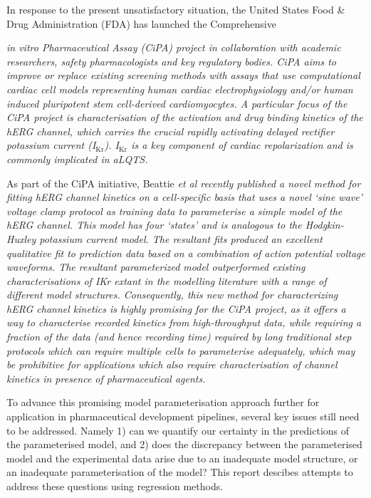 \documentclass[11pt,a4paper,oneside]{article}
\begin{document}
In response to the present unsatisfactory situation, the United States Food \& Drug Administration (FDA) has launched the Comprehensive {\it{in vitro} Pharmaceutical Assay (CiPA) project in collaboration with academic researchers, safety pharmacologists and key regulatory bodies. CiPA aims to improve or replace existing screening methods with assays that use computational cardiac cell models representing human cardiac electrophysiology and/or human induced pluripotent stem cell-derived cardiomyocytes. A particular focus of the CiPA project is characterisation of the activation and drug binding kinetics of the hERG channel, which carries the crucial rapidly activating delayed rectifier potassium current (I$_{\text{Kr}}$). I$_{\text{Kr}}$ is a key component of cardiac repolarization and is commonly implicated in aLQTS.

As part of the CiPA initiative, Beattie \it{et al} recently published a novel method for fitting hERG channel kinetics on a cell-specific basis that uses a novel `sine wave' voltage clamp protocol as training data to parameterise a simple model of the hERG channel. This model has four `states' and is analogous to the Hodgkin-Huxley potassium current model. The resultant fits produced an excellent qualitative fit to prediction data based on a combination of action potential voltage waveforms. The resultant parameterized model outperformed existing characterisations of IKr extant in the modelling literature with a range of different model structures. Consequently, this new method for characterizing hERG channel kinetics is highly promising for the CiPA project, as it offers a way to characterise recorded kinetics from high-throughput data, while requiring a fraction of the data (and hence recording time) required by long traditional step protocols which can require multiple cells to parameterise adequately, which may be prohibitive for applications which also require characterisation of channel kinetics in presence of pharmaceutical agents.

To advance this promising model parameterisation approach further for application in pharmaceutical development pipelines, several key issues still need to be addressed. Namely 1) can we quantify our certainty in the predictions of the parameterised model, and 2) does the discrepancy between the parameterised model and the experimental data arise due to an inadequate model structure, or an inadequate parameterisation of the model? This report descibes attempts to address these questions using regression methods.

}
\end{document}

